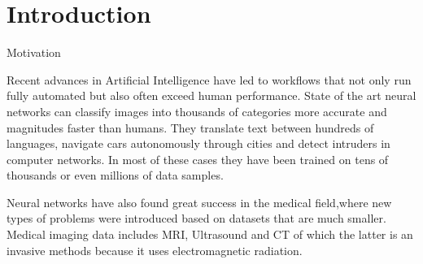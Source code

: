 \section{Introduction}

Motivation

Recent advances in Artificial Intelligence have led to workflows that not only run fully automated but also often exceed human performance. State of the art neural networks can classify images into thousands of categories more accurate and magnitudes faster than humans. They translate text between hundreds of languages, navigate cars autonomously through cities and detect intruders in computer networks. In most of these cases they have been trained on tens of thousands or even millions of data samples. 

Neural networks have also found great success in the medical field,where new types of problems were introduced based on datasets that are much smaller. Medical imaging data includes MRI, Ultrasound and CT of which the latter is an invasive methods because it uses electromagnetic radiation.

\newpage
